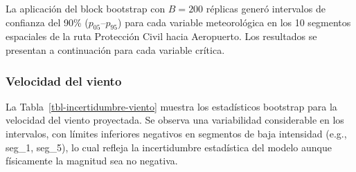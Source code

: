 \documentclass[
  spanish,
  us-letterpaper,
]{scrreprt}
\numberwithin{equation}{section}
\begin{document}
La aplicación del block bootstrap con \(B = 200\) réplicas generó
intervalos de confianza del 90\% (\(p_{05}\)--\(p_{95}\)) para cada
variable meteorológica en los 10 segmentos espaciales de la ruta
Protección Civil hacia Aeropuerto. Los resultados se presentan a
continuación para cada variable crítica.

\subsubsection{Velocidad del viento}\label{velocidad-del-viento}

La Tabla~\ref{tbl-incertidumbre-viento} muestra los estadísticos
bootstrap para la velocidad del viento proyectada. Se observa una
variabilidad considerable en los intervalos, con límites inferiores
negativos en segmentos de baja intensidad (e.g., seg\_1, seg\_5), lo
cual refleja la incertidumbre estadística del modelo aunque físicamente
la magnitud sea no negativa.
\end{document}
